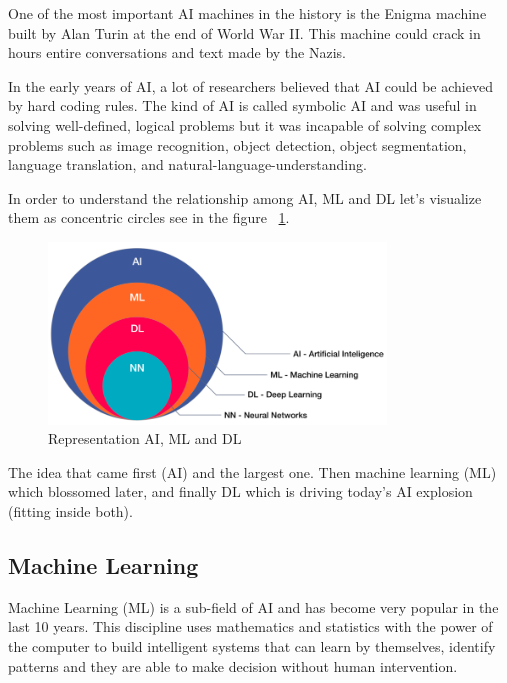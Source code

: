 One of the most important AI machines in the history is the Enigma machine built by Alan Turin at the end of World War II. 
This machine could crack in hours entire conversations and text made by the Nazis.

In the early years of AI, a lot of researchers believed that AI could be achieved by hard coding rules. The kind of AI is called symbolic AI and was useful in solving well-defined, logical problems but it was incapable of solving complex problems such as image recognition, object detection, object segmentation, language translation, and natural-language-understanding.

In order to understand the relationship among AI, ML and DL let's visualize them as concentric circles see in the figure ~\ref{fig:iacircles}.


\begin{figure}[H]
\centering
\includegraphics[width=0.8\textwidth]{./figures/ai-ml-dl}
\caption{Representation AI, ML and DL \cite{ai-ml-dl-image}}
\label{fig:iacircles}
\end{figure}

The idea that came first (AI) and the largest one. Then machine learning (ML) which blossomed later, and finally DL which is driving today's AI explosion (fitting inside both).

\subsection[Machine Learning]{Machine Learning}
Machine Learning (ML) is a sub-field of AI and has become very popular in the last 10 years. This discipline uses mathematics and statistics with the power of the computer to build intelligent systems that can learn by themselves, identify patterns and they are able to make decision without human intervention.


